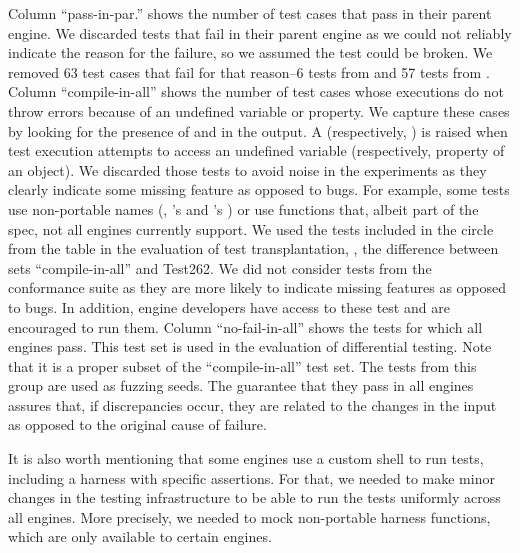 \documentclass[10pt,conference,anonymous]{IEEEtran}
\begin{document}
Column ``pass-in-par.'' shows the number of test cases that pass in
their parent engine. We discarded tests that fail in their parent
engine as we could not reliably indicate the reason for the failure,
so we assumed the test could be broken. We removed 63 test cases that
fail for that reason--6 tests from \jsc{} and 57 tests from
\smonkey. Column ``compile-in-all'' shows the number of test cases
whose executions do not throw errors because of an undefined variable
or property. We capture these cases by looking for the presence of
 and  in the output. A
 (respectively, ) is raised
when test execution attempts to access an undefined variable
(respectively, property of an object). We discarded those tests to
avoid noise in the experiments as they clearly indicate some missing
feature as opposed to bugs. For example, some tests use non-portable
names (\eg{}, \jsc{}'s  and \smonkey{}'s
) or use functions that, albeit part of the
spec, not all engines currently support. We used the
\totalTestFilesForTestTransplantation{} tests included in the circle
from the table in the evaluation of test transplantation, \ie{}, the
difference between sets ``compile-in-all'' and Test262. We did not
consider tests from the conformance suite as they are more likely to
indicate missing features as opposed to bugs. In addition, engine
developers have access to these test and are encouraged to run
them. Column ``no-fail-in-all'' shows the tests for which all engines
pass. This test set is used in the evaluation of differential
testing. Note that it is a proper subset of the ``compile-in-all''
test set. The tests from this group are used as fuzzing seeds. The
guarantee that they pass in all engines assures that, if discrepancies
occur, they are related to the changes in the input as opposed to the
original cause of failure.

It is also worth mentioning that some engines use a custom shell to
run tests, including a harness with specific assertions.  For that, we
needed to make minor changes in the testing infrastructure to be able
to run the tests uniformly across all engines. More precisely, we
needed to mock non-portable harness functions, which are only
available to certain engines.

\newcommand\marktopleft[1]{%
    \tikz[overlay,remember picture] 
        \node (marker-#1-a) at (0,1.5ex) {};%
}
\newcommand\markbottomright[1]{%
    \tikz[overlay,remember picture] 
        \node (marker-#1-b) at (0,0) {};%
    \tikz[overlay,remember picture,thick,dashed,inner sep=3pt]
        \node[draw,rounded rectangle,fit=(marker-#1-a.center) (marker-#1-b.center)] {};%
}
\end{document}
